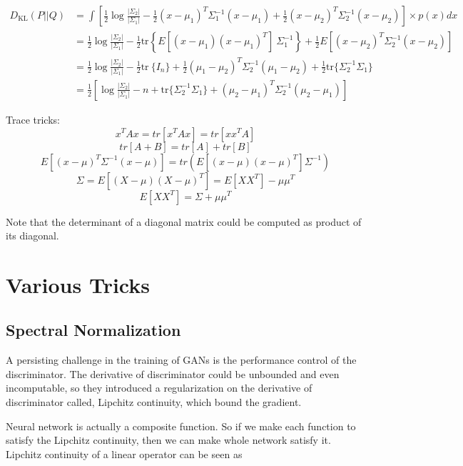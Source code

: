 \begin{appendices}
\begin{align*}
D_\text{KL}(P||Q) &= \int \left[ \frac{1}{2} \log\frac{|\Sigma_2|}{|\Sigma_1|} - \frac{1}{2} (x-\mu_1)^T\Sigma_1^{-1}(x-\mu_1) + \frac{1}{2} (x-\mu_2)^T\Sigma_2^{-1}(x-\mu_2) \right] \times p(x) dx \\
&= \frac{1}{2} \log\frac{|\Sigma_2|}{|\Sigma_1|} - \frac{1}{2} \text{tr} \left\{E[(x - \mu_1)(x - \mu_1)^T] \ \Sigma_1^{-1} \right\} + \frac{1}{2} E[(x - \mu_2)^T \Sigma_2^{-1} (x - \mu_2)] \\
&= \frac{1}{2} \log\frac{|\Sigma_2|}{|\Sigma_1|} - \frac{1}{2} \text{tr}\ \{I_n \} + \frac{1}{2} (\mu_1 - \mu_2)^T \Sigma_2^{-1} (\mu_1 - \mu_2) + \frac{1}{2} \text{tr} \{ \Sigma_2^{-1} \Sigma_1 \} \\
&= \frac{1}{2}\left[\log\frac{|\Sigma_2|}{|\Sigma_1|} - n + \text{tr} \{ \Sigma_2^{-1}\Sigma_1 \} + (\mu_2 - \mu_1)^T \Sigma_2^{-1}(\mu_2 - \mu_1)\right]
\end{align*}

Trace tricks:
$$x^TAx = tr[x^TAx] = tr[xx^TA]$$
$$tr[A+B] = tr[A]+tr[B]$$
$$E[(x-\mu)^T \Sigma^{-1} (x-\mu)]= tr(E[(x-\mu)(x-\mu)^T] \Sigma^{-1})$$
$$\Sigma = E[(X-\mu)(X-\mu)^T]=E[XX^T]-\mu\mu^T$$
$$E[XX^T] = \Sigma + \mu\mu^T$$

Note that the determinant of a diagonal matrix could be computed as product of its diagonal.



\section{Various Tricks}

\subsection{Spectral Normalization}

A persisting challenge in the training of GANs is the performance control of the discriminator. The derivative of discriminator could be unbounded and even incomputable, so they introduced a regularization on the derivative of discriminator called, Lipchitz continuity, which bound the gradient.

Neural network is actually a composite function. So if we make each function to satisfy the Lipchitz continuity, then we can make whole network satisfy it. Lipchitz continuity of a linear operator can be seen as 


\end{appendices}
